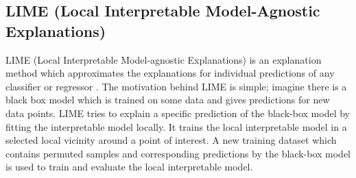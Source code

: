 \documentclass[english]{tktltiki2}
\theoremstyle{definition}
\theoremstyle{remark}
\begin{document}

\subsection{ LIME (Local Interpretable Model-Agnostic Explanations)}\label{sec:LIME} %
LIME (Local Interpretable Model-agnostic Explanations) is an explanation method which approximates the explanations for individual predictions of any classifier or regressor \citep{ribeiro2016should}. The motivation behind LIME is simple; imagine there is a black box model which is trained on some data and gives predictions for new data points. LIME tries to explain a specific prediction of the black-box model by fitting the interpretable model locally. It trains the local interpretable model in a selected local vicinity around a point of interest. A new training dataset which contains permuted samples and corresponding predictions by the black-box model is used to train and evaluate the local interpretable model. 
\end{document}
